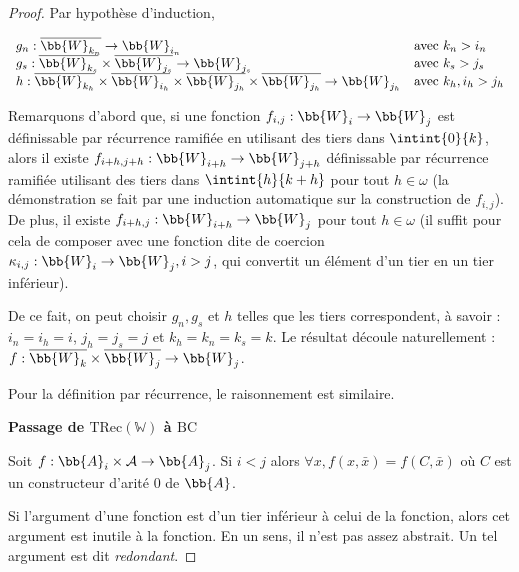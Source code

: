 \documentclass{report}
\newcommand{\TRec}[1]{\text{TRec}\left(\mathbb{#1}\right)}
\begin{document}
\begin{proof}
				Par hypothèse d'induction, 
				
				\[
					\begin{array}{ll}
					g_n : \overline{\bb{W}_{k_n}} \to \bb{W}_{i_n} & \text{avec $k_n > i_n$}\\
					g_s : \overline{\bb{W}_{k_s}} \times \overline{\bb{W}_{j_s}} \to \bb{W}_{j_s} & \text{avec $k_s > j_s$} \\
					h : \overline{\bb{W}_{k_h}} \times \overline{\bb{W}_{i_h}} \times \overline{\bb{W}_{j_h}} \times \overline{\bb{W}_{j_h}} \to \bb{W}_{j_h} & \text{avec $k_h, i_h > j_h$}
					\end{array}
				\]
				
				Remarquons d'abord que, si une fonction $f_{i,j} : \bb{W}_i \to \bb{W}_j$ est définissable par récurrence ramifiée en utilisant des tiers dans $\intint{0}{k}$, alors il existe $f_{i+h, j+h} : \bb{W}_{i+h} \to \bb{W}_{j+h}$ définissable par récurrence ramifiée utilisant des tiers dans $\intint{h}{k+h}$ pour tout $h \in \omega$ (la démonstration se fait par une induction automatique sur la construction de $f_{i,j}$). De plus, il existe $f_{i+h,j} : \bb{W}_{i+h} \to \bb{W}_j$ pour tout $h \in \omega$ (il suffit pour cela de composer avec une fonction dite de coercion $\kappa_{i,j} : \bb{W}_i \to \bb{W}_j, i>j$, qui convertit un élément d'un tier en un tier inférieur).
				
				De ce fait, on peut choisir $g_n, g_s$ et $h$ telles que les tiers correspondent, à savoir : $i_n = i_h = i$, $j_h = j_s = j$ et $k_h = k_n = k_s = k$. Le résultat découle naturellement : $f : \overline{\bb{W}_{k}} \times \overline{\bb{W}_{j}} \to \bb{W}_{j}$.
				
				Pour la définition par récurrence, le raisonnement est similaire. 
				
				\espace
				
				\textbf{Passage de $\TRec{W}$ à $\text{BC}$}
				
				\begin{lemma}
					\label{lem:arg_redondant}
					Soit $f : \bb{A}_i \times \mathcal{A} \to \bb{A}_j$. Si $i < j$ alors $\forall x, f(x, \bar{x}) = f(C, \bar{x})$ où $C$ est un constructeur d'arité $0$ de $\bb{A}$.
				\end{lemma}
				
				Si l'argument d'une fonction est d'un tier inférieur à celui de la fonction, alors cet argument est inutile à la fonction. En un sens, il n'est pas assez abstrait. Un tel argument est dit \emph{redondant}.
				

\end{proof}
\end{document}
